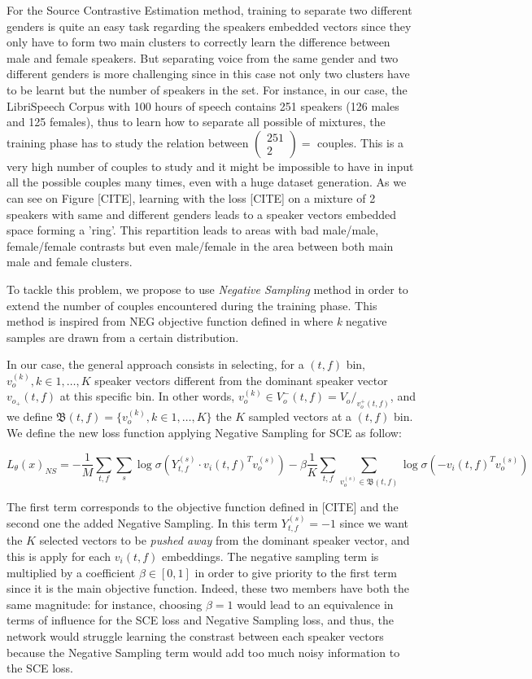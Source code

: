 \documentclass[master,final,11pt]{iscs-thesis}
\begin{document}
For the Source Contrastive Estimation method, training to separate two different genders is quite an easy task regarding the speakers embedded vectors since they only have to form two main clusters to correctly learn the difference between male and female speakers. But separating voice from the same gender and two different genders is more challenging since in this case not only two clusters have to be learnt but the number of speakers in the set. For instance, in our case, the LibriSpeech Corpus with 100 hours of speech contains 251 speakers (126 males and 125 females), thus to learn how to separate all possible of mixtures, the training phase has to study the relation between $\left(\! \begin{array}{c} 251 \\ 2 \end{array} \!\right) = $ couples. This is a very high number of couples to study and it might be impossible to have in input all the possible couples many times, even with a huge dataset generation. As we can see on Figure [CITE], learning with the loss [CITE] on a mixture of 2 speakers with same and different genders leads to a speaker vectors embedded space forming a 'ring'. This repartition leads to areas with bad male/male, female/female contrasts but even male/female in the area between both main male and female clusters. 

To tackle this problem, we propose to use \textit{Negative Sampling} method in order to extend the number of couples encountered during the training phase. This method is inspired from NEG objective function  defined in \cite{NS} where \textit{k} negative samples are drawn from a certain distribution. 

In our case, the general approach consists in selecting, for a $(t,f)$ bin, $v_o^{(k)}, k \in 1,\dotsc,K$ speaker vectors different from the dominant speaker vector $v_{o_{+}}(t,f)$ at this specific bin. In other words, $v_o^{(k)} \in V_o^-(t,f) = V_o/_{v_o^+(t,f)}$, and we define $\mathfrak{B}(t,f) = \{v_o^{(k)}, k \in 1,\dotsc,K\}$ the $K$ sampled vectors at a $(t,f)$ bin. We define the new loss function applying Negative Sampling for SCE as follow:

\[L_\theta(x)_{NS} = - \frac{1}{M} \sum_{t,f} \sum_{s} \log \sigma(Y_{t,f}^{(s)} \cdot v_i(t,f)^{T} v_o^{(s)}) - \beta \frac{1}{K} \sum_{t,f} \sum_{v_o^{(s)} \in \mathfrak{B}(t,f)} \log \sigma(- v_i(t,f)^{T} v_o^{(s)}) \]

The first term corresponds to the objective function defined in [CITE] and the second one the added Negative Sampling. In this term $Y_{t,f}^{(s)} = -1$ since we want the $K$ selected vectors to be \textit{pushed away} from the dominant speaker vector, and this is apply for each $v_i(t,f)$ embeddings. The negative sampling term is multiplied by a coefficient $\beta \in[0,1]$ in order to give priority to the first term since it is the main objective function. Indeed, these two members have both the same magnitude: for instance, choosing $\beta = 1$ would lead to an equivalence in terms of influence for the SCE loss and Negative Sampling loss, and thus, the network would struggle learning the constrast between each speaker vectors because the Negative Sampling term would add too much noisy information to the SCE loss. 
\end{document}
